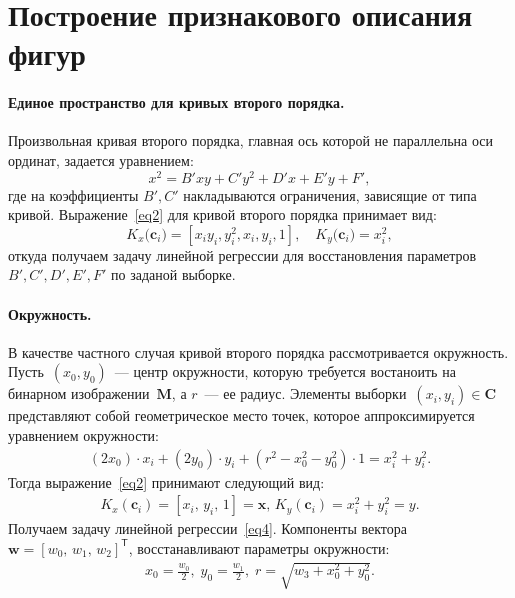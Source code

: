 \documentclass[12pt]{a&t}
\begin{document}
\section{Построение признакового описания фигур}
\paragraph{Единое пространство для кривых второго порядка.} Произвольная кривая второго порядка, главная ось которой не параллельна оси ординат, задается  уравнением:
\[
\label{st:coef}
x^2 = B'xy+C'y^2+D'x+E'y+F',
\]
где на коэффициенты $B', C'$ накладываются ограничения, зависящие от типа кривой. Выражение~\eqref{eq2} для кривой второго порядка принимает вид:
\[
\label{st:K_map}
K_x\bigr(\mathbf{c}_i\bigr)=\left[x_iy_i, y_i^2, x_i, y_i, 1\right], \quad K_y\bigr(\mathbf{c}_i\bigr)=x_i^2,
\]
откуда получаем задачу линейной регрессии для восстановления параметров ~$B', C', D', E', F'$ по заданой выборке.

\paragraph{Окружность.} В качестве частного случая кривой второго порядка рассмотривается окружность.
Пусть~$(x_0, y_0)$~--- центр окружности, которую требуется востаноить на бинарном изображении~$\mathbf{M}$, а $r$~--- ее радиус.
Элементы выборки~$(x_i, y_i) \in \mathbf{C}$ представляют собой геометрическое место точек, которое аппроксимируется уравнением окружности:
\begin{gather}(2x_0)\cdot x_i + (2y_0)\cdot y_i + (r^2 - x_0^2 - y_0^2)\cdot 1 = x_i^2 + y_i^2. 
\end{gather}
Тогда выражение~\eqref{eq2} принимают следующий вид:
\begin{gather}
\label{10}
K_{x}(\mathbf{c}_i) = [x_i, \, y_i, \, 1] = \mathbf{x}, \,  K_{y}(\mathbf{c}_i) = x_i^2+y_i^2 = y.
\end{gather} 
Получаем задачу линейной регрессии~\eqref{eq4}.
Компоненты вектора~$\mathbf{w} = [w_0, \, w_1, \, w_2]^\mathsf{T}$, восстанавливают параметры окружности:
\begin{gather}
x_0 = \frac{w_0}{2}, \; y_0 = \frac{w_1}{2}, \; r = \sqrt{w_3 + x_0^2 + y_0 ^2}.
\end{gather}
\end{document}

